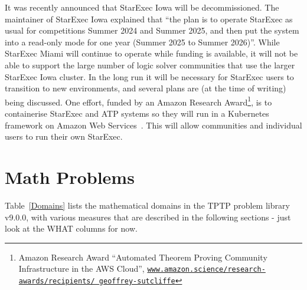 \documentclass[runningheads]{llncs}
\begin{document}
It was recently announced that StarExec Iowa will be decommissioned. 
The maintainer of StarExec Iowa explained that ``the plan is to operate StarExec as usual for 
competitions Summer 2024 and Summer 2025, and then put the system into a read-only mode for one 
year (Summer 2025 to Summer 2026)''.
While StarExec Miami will continue to operate while funding is available, it will not be able
to support the large number of logic solver communities that use the larger StarExec Iowa cluster.
In the long run it will be necessary for StarExec users to transition to new environments,
and several plans are (at the time of writing) being discussed.
One effort, funded by an Amazon Research Award\footnote{%
Amazon Research Award ``Automated Theorem Proving Community Infrastructure in the AWS Cloud'',
\href{https://www.amazon.science/research-awards/recipients/geoffrey-sutcliffe}{\tt www.amazon.science/research-awards/recipients/ geoffrey-sutcliffe}},
is to containerise StarExec and ATP systems so they will run in a Kubernetes framework on 
Amazon Web Services~\cite{FMS24}.
This will allow communities and individual users to run their own StarExec.

\section{Math Problems}
\label{MathProblems}

Table~\ref{Domains} lists the mathematical domains in the TPTP problem library v9.0.0, with 
various measures that are described in the following sections - just look at the WHAT columns 
for now.
\end{document}
